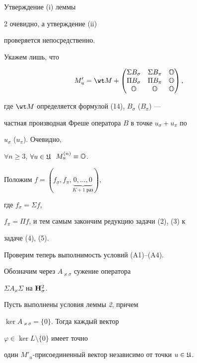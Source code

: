 Утверждение (i) леммы


2 очевидно, а утверждение (ii)


проверяется непосредственно.


Укажем лишь, что


\begin{equation}


M'_u=\wt M+


\begin{pmatrix}


\Sigma B_\sigma & \Sigma B_\pi & \bo\\


\Pi B_\sigma & \Pi B_\pi & \bo\\


\bo & \bo & \bo


\end{pmatrix}


,


\end{equation}


где $\wt M$ определяется формулой (14), $B_\sigma$ ($B_\pi$) ---


частная производная Фреше оператора $B$ в точке $u_\sigma+u_\pi$ по


$u_\sigma$ ($u_\pi$). Очевидно,


$\forall n\ge 3$, $\forall u\in\frak U\;$ $M^{(n)}_u\equiv\Bbb O$.





Положим $f=(f_\sigma,f_\pi,\underbrace{0,\dotsc,0}_{K+1\text{ раз}})$,


где $f_\sigma=\Sigma f$,


$f_\pi=\Pi f$, и тем самым закончим редукцию задачи (2), (3) к


задаче (4), (5).





Проверим теперь выполнимость условий (A1)--(A4).


Обозначим через $A_{\varkappa\sigma}$ сужение оператора


$\Sigma A_\varkappa\Sigma$ на $\bold H^2_\sigma$.





\begin{lem} Пусть выполнены условия леммы {\em 2}, причем


$\ker A_{\varkappa\sigma}=\{0\}$. Тогда каждый вектор


$\varphi\in\ker L\setminus\{0\}$ имеет точно


один $M'_u$-присоединенный вектор независимо от точки $u\in\frak U$.


\end{lem}





